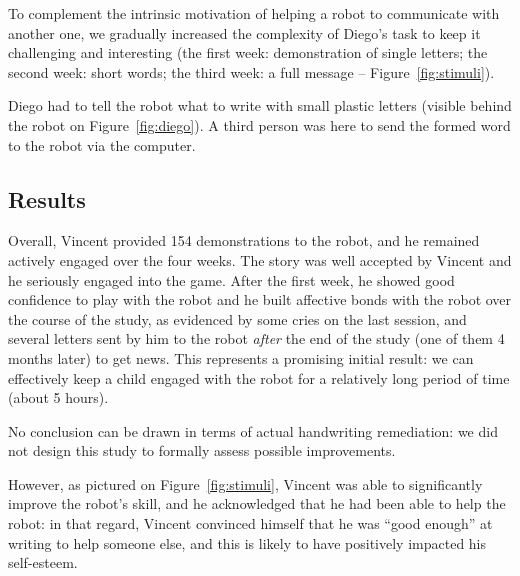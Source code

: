\documentclass{sig-alternate}
\begin{document}
To complement the intrinsic motivation of helping a robot to communicate with another one, we
gradually increased the complexity of Diego's task to keep it challenging and
interesting (the first week: demonstration of single letters; the second week:
short words; the third week: a full message -- Figure~\ref{fig:stimuli}).

Diego had to tell the robot what to write with small plastic letters (visible
behind the robot on Figure~\ref{fig:diego}). A third person was here to send
the formed word to the robot via the computer.



\subsection{Results}
Overall, Vincent provided 154 demonstrations to the robot, and he remained
actively engaged over the four weeks. The story was well accepted by Vincent and
he seriously engaged into the game. After the first week, he showed good
confidence to play with the robot and he built affective bonds with the robot
over the course of the study, as evidenced by some cries on the last session,
and several letters sent by him to the robot \emph{after} the end of the study
(one of them 4 months later) to get news. This represents a promising initial
result: we can effectively keep a child engaged with the robot for a relatively
long period of time (about 5 hours).

No conclusion can be drawn in terms of actual handwriting remediation: we did
not design this study to formally assess possible improvements.

However, as pictured on Figure~\ref{fig:stimuli}, Vincent was able to
significantly improve the robot's skill, and he acknowledged that he had been
able to help the robot: in that regard, Vincent convinced himself that he was
``good enough'' at writing to help someone else, and this is likely to have
positively impacted his self-esteem.
\end{document}
